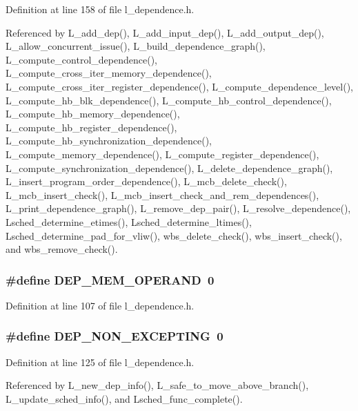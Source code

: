 Definition at line 158 of file l\_\-dependence.h.

Referenced by L\_\-add\_\-dep(), L\_\-add\_\-input\_\-dep(), L\_\-add\_\-output\_\-dep(), L\_\-allow\_\-concurrent\_\-issue(), L\_\-build\_\-dependence\_\-graph(), L\_\-compute\_\-control\_\-dependence(), L\_\-compute\_\-cross\_\-iter\_\-memory\_\-dependence(), L\_\-compute\_\-cross\_\-iter\_\-register\_\-dependence(), L\_\-compute\_\-dependence\_\-level(), L\_\-compute\_\-hb\_\-blk\_\-dependence(), L\_\-compute\_\-hb\_\-control\_\-dependence(), L\_\-compute\_\-hb\_\-memory\_\-dependence(), L\_\-compute\_\-hb\_\-register\_\-dependence(), L\_\-compute\_\-hb\_\-synchronization\_\-dependence(), L\_\-compute\_\-memory\_\-dependence(), L\_\-compute\_\-register\_\-dependence(), L\_\-compute\_\-synchronization\_\-dependence(), L\_\-delete\_\-dependence\_\-graph(), L\_\-insert\_\-program\_\-order\_\-dependence(), L\_\-mcb\_\-delete\_\-check(), L\_\-mcb\_\-insert\_\-check(), L\_\-mcb\_\-insert\_\-check\_\-and\_\-rem\_\-dependences(), L\_\-print\_\-dependence\_\-graph(), L\_\-remove\_\-dep\_\-pair(), L\_\-resolve\_\-dependence(), Lsched\_\-determine\_\-etimes(), Lsched\_\-determine\_\-ltimes(), Lsched\_\-determine\_\-pad\_\-for\_\-vliw(), wbs\_\-delete\_\-check(), wbs\_\-insert\_\-check(), and wbs\_\-remove\_\-check().
\subsubsection{\setlength{\rightskip}{0pt plus 5cm}\#define DEP\_\-MEM\_\-OPERAND~0}\label{l__dependence_8h_a1a43eadd7bb31302abdeb28f606497b}




Definition at line 107 of file l\_\-dependence.h.
\subsubsection{\setlength{\rightskip}{0pt plus 5cm}\#define DEP\_\-NON\_\-EXCEPTING~0}\label{l__dependence_8h_17bacd910de7ce678a5feb98a92904cb}




Definition at line 125 of file l\_\-dependence.h.

Referenced by L\_\-new\_\-dep\_\-info(), L\_\-safe\_\-to\_\-move\_\-above\_\-branch(), L\_\-update\_\-sched\_\-info(), and Lsched\_\-func\_\-complete().
